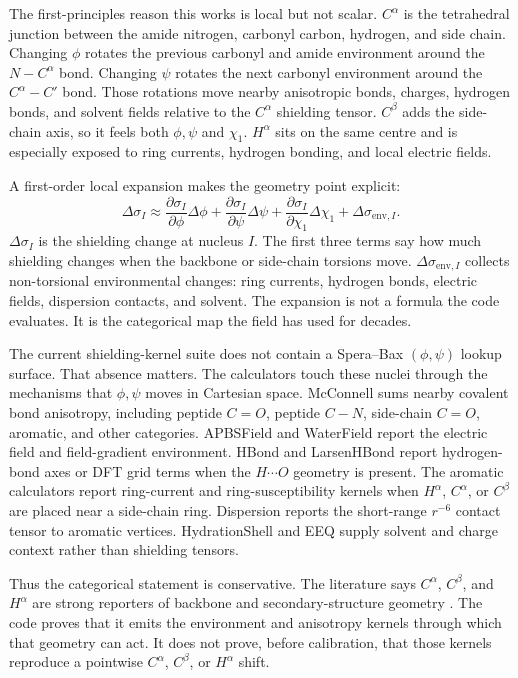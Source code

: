 \documentclass[11pt]{article}
\begin{document}
The first-principles reason this works is local but not scalar. \(C^\alpha\) is
the tetrahedral junction between the amide nitrogen, carbonyl carbon, hydrogen,
and side chain. Changing \(\phi\) rotates the previous carbonyl and amide
environment around the \(N-C^\alpha\) bond. Changing \(\psi\) rotates the next
carbonyl environment around the \(C^\alpha-C'\) bond. Those rotations move
nearby anisotropic bonds, charges, hydrogen bonds, and solvent fields relative
to the \(C^\alpha\) shielding tensor. \(C^\beta\) adds the side-chain axis, so
it feels both \(\phi,\psi\) and \(\chi_1\). \(H^\alpha\) sits on the same
centre and is especially exposed to ring currents, hydrogen bonding, and local
electric fields.

A first-order local expansion makes the geometry point explicit:
\[
  \Delta\sigma_I
  \approx
  \frac{\partial\sigma_I}{\partial\phi}\Delta\phi
  +
  \frac{\partial\sigma_I}{\partial\psi}\Delta\psi
  +
  \frac{\partial\sigma_I}{\partial\chi_1}\Delta\chi_1
  +
  \Delta\sigma_{\mathrm{env},I}.
\]
\(\Delta\sigma_I\) is the shielding change at nucleus \(I\). The first three
terms say how much shielding changes when the backbone or side-chain torsions
move. \(\Delta\sigma_{\mathrm{env},I}\) collects non-torsional environmental
changes: ring currents, hydrogen bonds, electric fields, dispersion contacts,
and solvent. The expansion is not a formula the code evaluates. It is the
categorical map the field has used for decades.

The current shielding-kernel suite does not contain a Spera--Bax
\((\phi,\psi)\) lookup surface. That absence matters. The calculators touch
these nuclei through the mechanisms that \(\phi,\psi\) moves in Cartesian
space. McConnell sums nearby covalent bond anisotropy, including peptide
\(C=O\), peptide \(C-N\), side-chain \(C=O\), aromatic, and other categories.
APBSField and WaterField report the electric field and field-gradient
environment. HBond and LarsenHBond report hydrogen-bond axes or DFT grid terms
when the \(H\cdots O\) geometry is present. The aromatic calculators report
ring-current and ring-susceptibility kernels when \(H^\alpha\), \(C^\alpha\),
or \(C^\beta\) are placed near a side-chain ring. Dispersion reports the
short-range \(r^{-6}\) contact tensor to aromatic vertices. HydrationShell and
EEQ supply solvent and charge context rather than shielding tensors.

Thus the categorical statement is conservative. The literature says
\(C^\alpha\), \(C^\beta\), and \(H^\alpha\) are strong reporters of backbone
and secondary-structure geometry \cite{dedios1993,williamson1990,wishart1992,shenbax2007}.
The code proves that it emits the environment and anisotropy kernels through
which that geometry can act. It does not prove, before calibration, that those
kernels reproduce a pointwise \(C^\alpha\), \(C^\beta\), or \(H^\alpha\)
shift.
\end{document}
